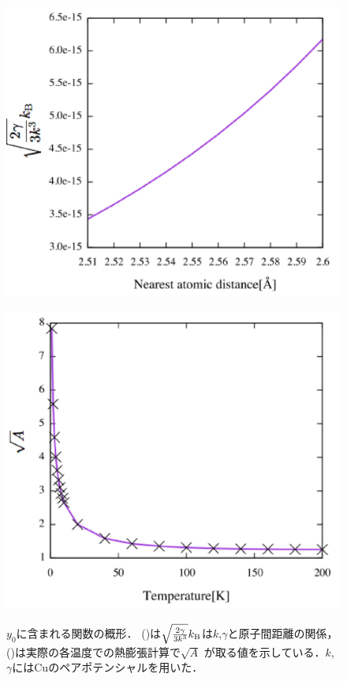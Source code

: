 \begin{figure}[htbp]
 \begin{minipage}[b]{0.5\linewidth}
  \centering
  \includegraphics[keepaspectratio, scale=0.42]
  {../image/y0_no_largea_label.eps}
  \subcaption{}\label{y0_heat1}
 \end{minipage}
 \begin{minipage}[b]{0.5\linewidth}
  \centering
  \includegraphics[keepaspectratio, scale=0.42]
  {../image/y0_largea_label.eps}
  \subcaption{}\label{y0_heat2}
 \end{minipage}
 \caption{$y_0$に含まれる関数の概形．
 ()は$\sqrt{\frac{2\gamma}{3k^3}}k_{\rm{B}}$は$k$,$\gamma$と原子間距離の関係，()は実際の各温度での熱膨張計算で$\sqrt{A}$ が取る値を示している．$k$, $\gamma$にはCuのペアポテンシャルを用いた．
 }\label{fig:y0_heat}
\end{figure}

